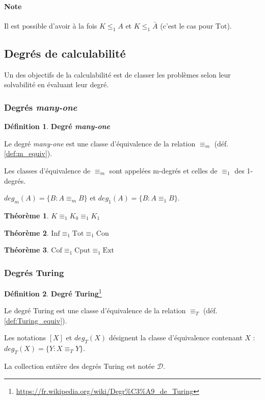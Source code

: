 \documentclass{book}
\theoremstyle{definition}
\newtheorem{theorem}{Théorème}
\newtheorem{definition}{Définition}
\numberwithin{lemma}{subsection}
\numberwithin{theorem}{subsection}
\numberwithin{definition}{subsection}
\numberwithin{proposition}{subsection}
\numberwithin{corollary}{subsection}
\numberwithin{property}{subsection}
\numberwithin{example}{subsection}
\numberwithin{heuristique}{subsection}
\numberwithin{scenario}{subsection}
\newcommand{\EnsInf}{\mathrm{Inf}}
\newcommand{\EnsTot}{\mathrm{Tot}}
\newcommand{\EnsCon}{\mathrm{Con}}
\newcommand{\EnsCof}{\mathrm{Cof}}
\newcommand{\EnsCput}{\mathrm{Cput}}
\newcommand{\EnsExt}{\mathrm{Ext}}
\begin{document}
            \paragraph{Note} Il est possible d'avoir à la fois $K \leq_1 A$ et $K \leq_1 \bar{A}$ (c'est le cas pour $\EnsTot$).
        
        \subsection{Degrés de calculabilité}
            Un des objectifs de la calculabilité est de classer les problèmes selon leur solvabilité en évaluant leur degré.
                
            \subsubsection{Degrés \textit{many-one}}
                \begin{definition}\textbf{Degré \textit{many-one}}
                    \par Le degré \textit{many-one} est une classe d'équivalence de la relation $\equiv_m$ (déf. \ref{def:m_equiv}).
                    \par Les classes d'équivalence de $\equiv_m$ sont appelées m-degrés et celles de $\equiv_1$ des 1-degrés.
                    \par $deg_m(A) = \{B : A \equiv_m B\}$ et $deg_1(A) = \{B : A \equiv_1 B\}$.
                \end{definition}
                
                \begin{theorem}
                    $K \equiv_1 K_0 \equiv_1 K_1$
                \end{theorem}
                \begin{theorem}
                    $\EnsInf \equiv_1 \EnsTot \equiv_1 \EnsCon$
                \end{theorem}
                \begin{theorem}
                    $\EnsCof \equiv_1 \EnsCput \equiv_1 \EnsExt$
                \end{theorem}
            
            \subsubsection{Degrés Turing}
                \begin{definition}\label{def:deg_turing}\textbf{Degré Turing}\footnote{\url{https://fr.wikipedia.org/wiki/Degr\%C3\%A9\_de\_Turing}}
                    \par Le degré Turing est une classe d'équivalence de la relation $\equiv_T$ (déf. \ref{def:Turing_equiv}).
                    \par Les notations $[X]$ et $deg_T(X)$ désignent la classe d'équivalence contenant $X$ : $deg_T(X) = \{Y : X \equiv_T Y\}$. 
                    \par La collection entière des degrés Turing est notée $\mathcal{D}$.
                \end{definition}
            
\end{document}
